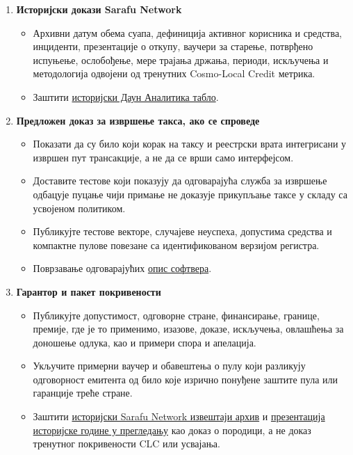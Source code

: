 \documentclass[11pt]{article}
\begin{document}
\begin{enumerate}[leftmargin=*]
\item \textbf{Историјски докази Sarafu Network}
\begin{itemize}[leftmargin=*]
\item Архивни датум обема суапа, дефиниција активног корисника и средства, инциденти, презентације о откупу, ваучери за старење, потврђено испуњење, ослобођење, мере трајања држања, периоди, искључења и методологија одвојени од тренутних Cosmo-Local Credit метрика.
\item Заштити \href{https://dune.com/grassrootseconomics/sarafu-network}{историјски Даун Аналитика табло}.
\end{itemize}
\item \textbf{Предложен доказ за извршење такса, ако се спроведе}
\begin{itemize}[leftmargin=*]
\item Показати да су било који корак на таксу и реестрски врата интегрисани у извршен пут трансакције, а не да се врши само интерфејсом.
\item Доставите тестове који показују да одговарајућа служба за извршење одбацује пуцање чији примање не доказује прикупљање таксе у складу са усвојеном политиком.
\item Публикујте тестове векторе, случајеве неуспеха, допустима средства и компактне пулове повезане са идентификованом верзијом регистра.
\item Поврзавање одговарајућих \href{https://software.grassecon.org}{опис софтвера}.
\end{itemize}
\item \textbf{Гарантор и пакет покривености}
\begin{itemize}[leftmargin=*]
\item Публикујте допустимост, одговорне стране, финансирање, границе, премије, где је то применимо, изазове, доказе, искључења, овлашћења за доношење одлука, као и примери спора и апелација.
\item Укључите примерни ваучер и обавештења о пулу који разликују одговорност емитента од било које изрично понуђене заштите пула или гаранције треће стране.
\item Заштити \href{https://sarafu.network/reports}{историјски Sarafu Network извештаји архив} и \href{https://youtu.be/5yGaP31bvs0?si=fZ-AMTEXsmVR8Ulv}{презентација историјске године у прегледању} као доказ о породици, а не доказ тренутног покривености CLC или усвајања.
\end{itemize}

\end{enumerate}
\end{document}
